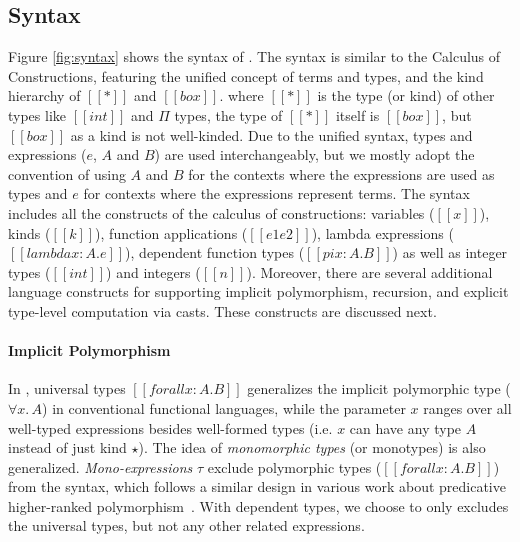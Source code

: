 \subsection{Syntax}

Figure \ref{fig:syntax} shows the syntax of \name. The syntax is similar
to the Calculus of Constructions, featuring the unified concept of terms and types,
and the kind hierarchy of $[[*]]$ and $[[box]]$.
where $[[*]]$ is the type (or kind) of other types like $[[int]]$ and $\Pi$ types,
the type of $[[*]]$ itself is $[[box]]$, but $[[box]]$ as a kind is not well-kinded.
Due to the unified syntax, types and
expressions ($e$, $A$ and $B$) are used
interchangeably, but we mostly adopt the convention of using $A$ and $B$
for the contexts where the expressions are used as types and $e$ for contexts
where the expressions represent terms.
The syntax includes all the constructs of the calculus of constructions:
variables ($[[x]]$), kinds ($[[k]]$), function applications  ($[[e1 e2]]$),
lambda expressions ($[[lambda x : A. e]]$), dependent function types ($[[pi x : A. B]]$)
as well as integer types ($[[int]]$) and integers ($[[n]]$).
Moreover, there are several additional language constructs for
supporting implicit polymorphism, recursion, and explicit type-level computation
via casts. These constructs are discussed next.

\paragraph{Implicit Polymorphism}
In \name, universal types $[[forall x : A. B]]$ generalizes the implicit
polymorphic type ($\forall x.\, A$) in conventional functional languages,
while the parameter $x$ ranges over all well-typed expressions besides well-formed
types (i.e. $x$ can have any type $A$ instead of just kind $\star$). The idea of
\emph{monomorphic types} (or monotypes) is also generalized.
\emph{Mono-expressions} $\tau$ exclude polymorphic types ($[[forall x : A. B]]$) from the syntax,
which follows a similar design in various work about predicative
higher-ranked polymorphism~\cite{odersky1996putting,dunfield2013complete,jones2007practical}.
With dependent types, we choose to only excludes the universal types, but not
any other related expressions.

